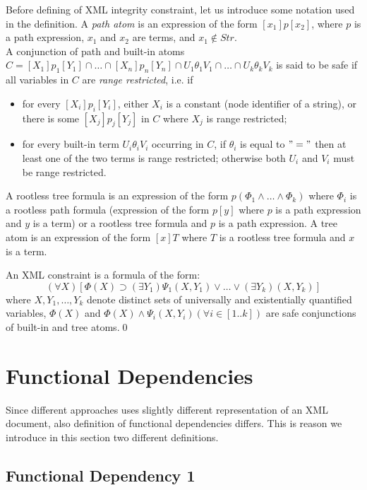 Before defining of XML integrity constraint, let us introduce some notation used in the definition. A \emph{path atom} is an expression of the form $[x_1]p[x_2]$, where $p$ is a path expression, $x_1$ and $x_2$ are terms, and $x_1 \not \in Str$.\\
A conjunction of path and built-in atoms $C = [X_1]p_1[Y_1] \cap \dots \cap [X_n]p_n[Y_n] \cap U_1\theta_1 V_1 \cap \dots \cap U_k \theta_k V_k$ is said to be safe if all variables in $C$ are \emph{range restricted}, i.e. if
\begin{itemize}
 	\item for every $[X_i]p_i[Y_i]$, either $X_i$ is a constant (node identifier of a string), or there is some $[X_j]p_j[Y_j]$ in $C$ where $X_j$ is range restricted;
    \item for every built-in term $U_i\theta_i V_i$ occurring in $C$, if $\theta_i$ is equal to $"="$ then at least one of the two terms is range restricted; otherwise both $U_i$ and $V_i$ must be range restricted.
 \end{itemize}
A rootless tree formula is an expression of the form $p(\Phi_1 \land \dots \land \Phi_k)$ where $\Phi_i$ is a rootless path formula (expression of the form $p[y]$ where $p$ is a path expression and $y$ is a term) or a rootless tree formula and $p$ is a path expression. A tree atom is an expression of the form $[x]T$ where $T$ is a rootless tree formula and $x$ is a term.

\begin{define}\label{integConstr}
An XML constraint is a formula of the form: $$(\forall X)[\Phi(X)\supset (\exists Y_1)\Psi_1(X,Y_1) \lor \dots \lor (\exists Y_k)(X,Y_k)]$$
where $X,Y_1,\dots, Y_k$ denote distinct sets of universally and existentially quantified variables, $\Phi(X)$ and $\Phi(X) \land \Psi_i(X, Y_i) (\forall i \in [1..k])$ are safe conjunctions of built-in and tree atoms.\qed
\end{define}

\section{Functional Dependencies}

Since different approaches uses slightly different representation of an XML document, also definition of functional dependencies differs. This is reason we introduce in this section two different definitions.

\subsection{Functional Dependency 1}

